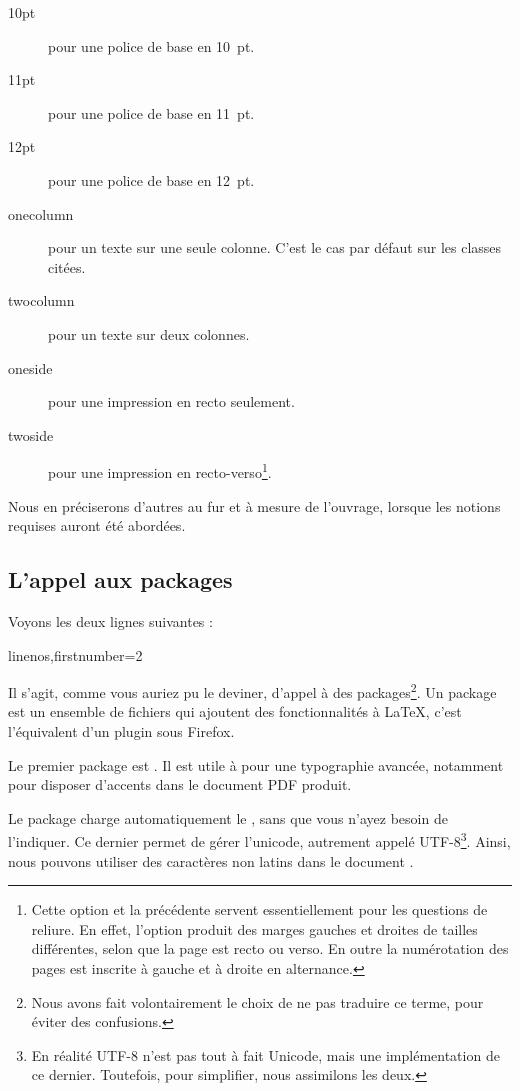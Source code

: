 \begin{description}
\item[10pt] pour une police de base en 10~pt.
\item[11pt] pour une police de base en 11~pt.
\item[12pt] pour une police de base en 12~pt.
\item[onecolumn] pour un texte sur une seule colonne. C'est le cas par défaut sur les classes citées.
\item[twocolumn] pour un texte sur deux colonnes.
\item[oneside] pour une impression en recto seulement. \label{nbsides}
\item[twoside] pour une impression en recto-verso\footnote{Cette option et la précédente servent essentiellement pour les questions de reliure. En effet, l'option  produit des marges gauches et droites de tailles différentes, selon que la page est recto ou verso. En outre la numérotation des pages est inscrite à gauche et à droite  en alternance.}.\label{rectoverso}
\end{description}

Nous en préciserons d'autres au fur et à mesure de l'ouvrage, lorsque les notions requises auront été abordées.

\subsection{L'appel aux packages}

Voyons les deux lignes suivantes : 

\begin{latexcode*}{linenos,firstnumber=2}
\usepackage{fontspec}
\usepackage{polyglossia}
\end{latexcode*}

Il s'agit, comme vous auriez pu le deviner, d'appel à des packages\footnote{Nous avons fait volontairement le choix de ne pas traduire ce terme, pour éviter des confusions.}. Un package est un ensemble de fichiers qui ajoutent des fonctionnalités à \LaTeX, c'est l'équivalent d'un plugin sous Firefox. 

Le premier package est . Il est utile à \XeLaTeX  pour une typographie avancée, notamment pour disposer d'accents dans le document PDF produit. 

Le package  charge automatiquement le  , sans que vous n'ayez besoin de l'indiquer. Ce dernier permet de gérer l'unicode, autrement appelé UTF-8\footnote{En réalité UTF-8 n'est pas tout à fait Unicode, mais une implémentation de ce dernier. Toutefois, pour simplifier, nous assimilons les deux.}. Ainsi, nous pouvons utiliser des caractères non latins dans le document .

